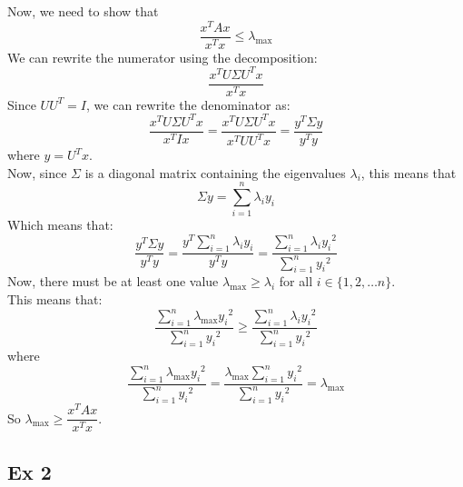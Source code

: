 \documentclass[12pt]{article}
\begin{document}
\begin{enumerate}[label=\letters]
        Now, we need to show that
        \[ \dfrac{x^TAx}{x^Tx} 
        \leq \lambda_{\text{max}} \]
        We can rewrite the numerator using the
        decomposition:
        \[ \dfrac{x^TU\Sigma U^Tx}{x^Tx} \]
        Since $UU^T = I$,
        we can rewrite the denominator as:
         \[ \dfrac{x^TU\Sigma U^Tx}{x^TIx} 
        = \dfrac{x^TU\Sigma U^Tx}{x^TUU^Tx}
        = \dfrac{y^T\Sigma y}{y^Ty} \]
        where $y = U^Tx$. \\
        Now, since $\Sigma$ is a diagonal matrix
        containing the eigenvalues $\lambda_i$,
        this means that
        \[ \Sigma y = \sum_{i = 1}^{n}\lambda_i y_i \]
        Which means that:
        \[ \dfrac{y^T\Sigma y}{y^Ty} 
        = \dfrac{y^T \sum_{i = 1}^{n}\lambda_i y_i}{y^Ty} 
        =  \dfrac{\sum_{i = 1}^{n}\lambda_i {y_i}^2}
        {\sum_{i=1}^{n}{y_i}^2} \]
        Now, there must be at least one value
        $\lambda_\text{max} \geq \lambda_i$
        for all $i \in \{1, 2, \dots n\}$. \\
        This means that:
        \[ \dfrac{\sum_{i = 1}^{n}\lambda_\text{max} {y_i}^2}
        {\sum_{i=1}^{n}{y_i}^2} \geq
        \dfrac{\sum_{i = 1}^{n}\lambda_i {y_i}^2}
        {\sum_{i=1}^{n}{y_i}^2} \]
        where
        \[ \dfrac{\sum_{i = 1}^{n}\lambda_\text{max} {y_i}^2}
        {\sum_{i=1}^{n}{y_i}^2} = 
        \dfrac{\lambda_\text{max}\sum_{i = 1}^{n}{y_i}^2}
        {\sum_{i=1}^{n}{y_i}^2} = 
        \lambda_\text{max} \]
        So $\lambda_\text{max} \geq 
        \dfrac{x^TAx}{x^Tx}$. \\
    \end{enumerate}

    \newpage

    \subsection*{Ex 2}
\end{document}
